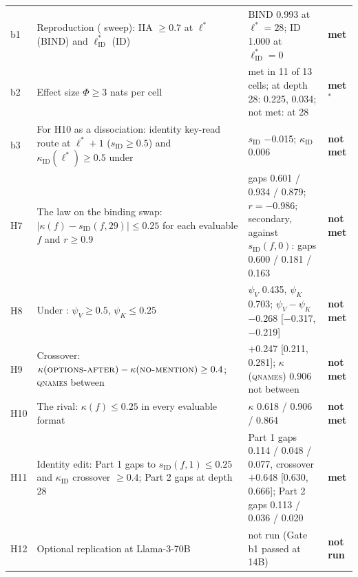 \begin{tabular}{p{}p{}p{}p{}}
b1 & Reproduction (\fmtNone{} sweep): IIA $\geq 0.7$ at $\ell^*$ (BIND) and $\ell^*_{\mathrm{ID}}$ (ID) & BIND 0.993 at $\ell^* = 28$; ID 1.000 at $\ell^*_{\mathrm{ID}} = 0$ & \textbf{met} \\
b2 & Effect size $\Phi \geq 3$ nats per cell & met in 11 of 13 cells; \fmtLetter{} at depth 28: 0.225, 0.034; not met: \fmtLetter{} at 28 & \textbf{met}$^*$ \\
b3 & For H10 as a dissociation: identity key-read route at $\ell^*+1$ ($s_{\mathrm{ID}} \geq 0.5$) and $\kappa_{\mathrm{ID}}(\ell^*) \geq 0.5$ under \fmtOpt{} & $s_{\mathrm{ID}}$ $-$0.015; $\kappa_{\mathrm{ID}}$ 0.006 & \textbf{not met} \\
\midrule
H7 & The law on the binding swap: $|\kappa(f) - s_{\mathrm{ID}}(f, 29)| \leq 0.25$ for each evaluable $f$ and $r \geq 0.9$ & gaps 0.601 / 0.934 / 0.879; $r = -0.986$; secondary, against $s_{\mathrm{ID}}(f, 0)$: gaps 0.600 / 0.181 / 0.163 & \textbf{not met} \\
H8 & Under \fmtNone{}: $\psi_V \geq 0.5$, $\psi_K \leq 0.25$ & $\psi_V$ 0.435, $\psi_K$ 0.703; $\psi_V-\psi_K$ $-$0.268 [$-$0.317, $-$0.219] & \textbf{not met} \\
H9 & Crossover: $\kappa(\text{\textsc{options-after}{}}) - \kappa(\text{\textsc{no-mention}{}}) \geq 0.4$; \textsc{qnames} between & $+$0.247 [0.211, 0.281]; $\kappa$(\textsc{qnames}) 0.906 not between & \textbf{not met} \\
H10 & The rival: $\kappa(f) \leq 0.25$ in every evaluable format & $\kappa$ 0.618 / 0.906 / 0.864 & \textbf{not met} \\
H11 & Identity edit: Part 1 gaps to $s_{\mathrm{ID}}(f, 1) \leq 0.25$ and $\kappa_{\mathrm{ID}}$ crossover $\geq 0.4$; Part 2 gaps at depth 28 & Part 1 gaps 0.114 / 0.048 / 0.077, crossover $+$0.648 [0.630, 0.666]; Part 2 gaps 0.113 / 0.036 / 0.020 & \textbf{met} \\
H12 & Optional replication at Llama-3-70B & not run (Gate b1 passed at 14B) & \textbf{not run} \\
\bottomrule
\end{tabular}
